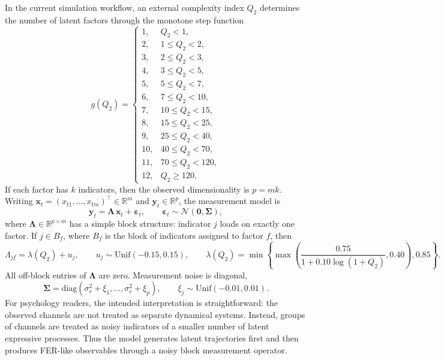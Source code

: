 \documentclass[10pt]{article}
\begin{document}
In the current simulation workflow, an external complexity index $Q_2$ determines the number of latent factors through the monotone step function
\begin{equation}
 g(Q_2)=
\begin{cases}
1,& Q_2<1,\\
2,& 1\le Q_2<2,\\
3,& 2\le Q_2<3,\\
4,& 3\le Q_2<5,\\
5,& 5\le Q_2<7,\\
6,& 7\le Q_2<10,\\
7,& 10\le Q_2<15,\\
8,& 15\le Q_2<25,\\
9,& 25\le Q_2<40,\\
10,& 40\le Q_2<70,\\
11,& 70\le Q_2<120,\\
12,& Q_2\ge 120.
\end{cases}
\label{eq:q2map}
\end{equation}
If each factor has $k$ indicators, then the observed dimensionality is $p=mk$. Writing $\bm x_t=(x_{t1},\dots,x_{tm})^\top\in\mathbb R^m$ and $\bm y_t\in\mathbb R^p$, the measurement model is
\begin{equation}
\bm y_t=\bm \Lambda\,\bm x_t+\bm \varepsilon_t,
\qquad
\bm \varepsilon_t\sim \mathcal N(\bm 0,\bm \Sigma),
\label{eq:mm}
\end{equation}
where $\bm \Lambda\in\mathbb R^{p\times m}$ has a simple block structure: indicator $j$ loads on exactly one factor. If $j\in B_f$, where $B_f$ is the block of indicators assigned to factor $f$, then
\begin{equation}
\Lambda_{jf}=\lambda(Q_2)+u_j,
\qquad
u_j\sim \mathrm{Unif}(-0.15,0.15),
\qquad
\lambda(Q_2)=\min\!\left\{\max\!\left(\frac{0.75}{1+0.10\log(1+Q_2)},0.40\right),0.85\right\}.
\label{eq:loadings}
\end{equation}
All off-block entries of $\bm \Lambda$ are zero. Measurement noise is diagonal,
\begin{equation}
\bm \Sigma=\mathrm{diag}(\sigma_r^2+\xi_1,\dots,\sigma_r^2+\xi_p),
\qquad
\xi_j\sim \mathrm{Unif}(-0.01,0.01).
\label{eq:sigma}
\end{equation}
For psychology readers, the intended interpretation is straightforward: the observed channels are not treated as separate dynamical systems. Instead, groups of channels are treated as noisy indicators of a smaller number of latent expressive processes. Thus the model generates latent trajectories first and then produces FER-like observables through a noisy block measurement operator.
\end{document}
